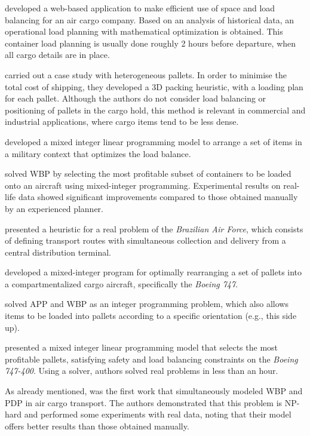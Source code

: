 \documentclass[preprint,authoryear]{elsarticle}
\begin{document}
\cite{fok2004optimizing} developed a web-based application to make efficient use of space and load balancing for an air cargo company. Based on an analysis of historical data, an operational load planning with mathematical optimization is obtained. This container load planning is usually done roughly 2 hours before departure, when all cargo details are in place.

\cite{Chan2006} carried out a case study with heterogeneous pallets. In order to minimise the total cost of shipping, they developed a 3D packing heuristic, with a loading plan for each pallet. Although the authors do not consider load balancing or positioning of pallets in the cargo hold, this method is relevant in commercial and industrial applications, where cargo items tend to be less dense.

\cite{KaluznyBohdanL2009Oalb} developed a mixed integer linear programming model to arrange a set of items in a military context that optimizes the load balance.

\cite{Verstichel2011} solved WBP by selecting the most profitable subset of containers to be loaded onto an aircraft using mixed-integer programming. Experimental results on real-life data showed significant improvements compared to those obtained manually by an experienced planner.

\cite{MesquitaCunha2011} presented a heuristic for a real problem of the {\it Brazilian Air Force}, which consists of defining transport routes with simultaneous collection and delivery from a central distribution terminal.

\cite{Limbourg2012} developed a mixed-integer program for optimally rearranging a set of pallets into a compartmentalized cargo aircraft, specifically the {\it Boeing 747}.

\cite{RoesenerHall2014} solved APP and WBP as an integer programming problem, which also allows items to be loaded into pallets according to a specific orientation (e.g., this side up).

\cite{Vancroonemburg2014} presented a mixed integer linear programming model that selects the most profitable pallets, satisfying safety and load balancing constraints on the {\it Boeing 747-400}. Using a solver, authors solved real problems in less than an hour.

As already mentioned, \cite{LurkinSchyns2015} was the first work that simultaneously modeled WBP and PDP in air cargo transport. The authors demonstrated that this problem is NP-hard and performed some experiments with real data, noting that their model offers better results than those obtained manually.
\end{document}
